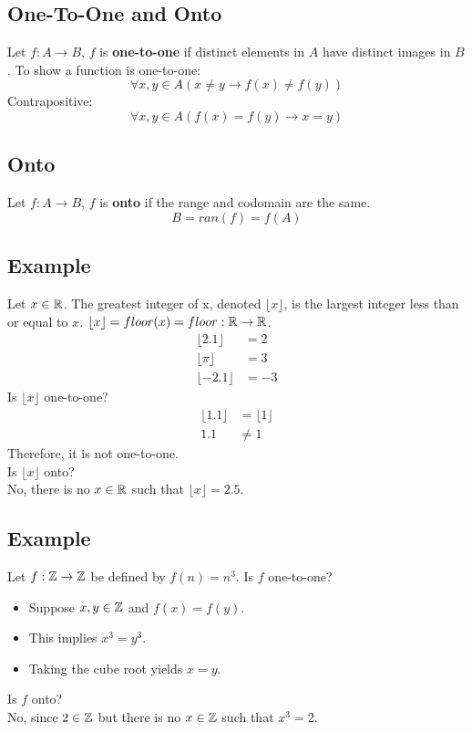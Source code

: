 \documentclass{math}
\begin{document}
\subsection*{One-To-One and Onto}
Let \( f:A\to B \), \( f \) is \textbf{one-to-one} if distinct elements in
\( A \) have distinct images in \( B \). To show a function is one-to-one:
\[ \forall{x,y}\in A (x\neq y \to f(x)\neq f(y)) \]
Contrapositive:
\[ \forall{x,y}\in A (f(x) = f(y) \to x = y) \]

\subsection*{Onto}
Let \( f:A\to B\), \( f \) is \textbf{onto} if the range and codomain are the
same.
\[ B = ran(f) = f(A) \]

\subsection*{Example}
Let \( x\in\mathbb{R} \). The greatest integer of x, denoted \( \lfloor x \rfloor \),
is the largest integer less than or equal to \( x \). \( \lfloor x \rfloor =
floor(x) = floor:\mathbb{R}\to\mathbb{R} \).
\begin{align*}
  \lfloor 2.1 \rfloor &= 2 \\
  \lfloor \pi \rfloor &= 3 \\
  \lfloor -2.1 \rfloor &= -3
\end{align*}
Is \( \lfloor x \rfloor \) one-to-one?
\begin{align*}
  \lfloor 1.1 \rfloor &= \lfloor 1 \rfloor \\
  1.1 &\neq 1
\end{align*}
Therefore, it is not one-to-one. \\
Is \( \lfloor x \rfloor \) onto? \\
No, there is no \( x\in\mathbb{R} \) such that \( \lfloor x \rfloor = 2.5 \).

\subsection*{Example}
Let \( f:\mathbb{Z}\to\mathbb{Z} \) be defined by \( f(n) = n^{3} \). Is \( f \) one-to-one?
\begin{itemize}
  \item Suppose \( x,y\in\mathbb{Z} \) and \( f(x) = f(y) \).
  \item This implies \( x^{3} = y^{3} \).
  \item Taking the cube root yields \( x = y \).
\end{itemize}
Is \( f \) onto? \\
No, since \( 2\in\mathbb{Z} \) but there is no \( x\in\mathbb{Z} \) such that \( x^{3} = 2 \).
\end{document}
